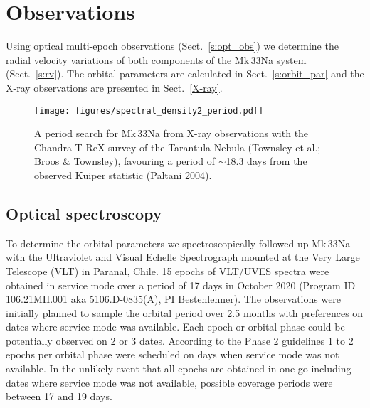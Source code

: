 \documentclass[fleqn,usenatbib]{mnras}
\begin{document}

\section{Observations}\label{UVES}
Using optical multi-epoch observations (Sect.~\ref{s:opt_obs}) we determine the radial velocity variations of both components of the Mk\,33Na system (Sect.~\ref{s:rv}). The orbital parameters are calculated in Sect.~\ref{s:orbit_par} and the X-ray observations are presented in Sect.~\ref{X-ray}.

\begin{figure}
	\texttt{[image: figures/spectral\_density2\_period.pdf]}
    \caption{A period search for Mk\,33Na from  X-ray observations with the Chandra T-ReX survey of the Tarantula Nebula (Townsley et al.; Broos \& Townsley), favouring a period of $\sim$18.3 days from the observed Kuiper statistic (Paltani 2004).}
    \label{f:spec_dens_period}
\end{figure}



\subsection{Optical spectroscopy\label{s:opt_obs}}

To determine the orbital parameters we spectroscopically followed up Mk\,33Na \citep[RA\,05:38:44.34, DEC\,-69:05:54.6, J2015.5, GaiaDR2][]{gaia2018} with the Ultraviolet and Visual Echelle Spectrograph \citep[UVES,][]{dekker2000} mounted at the Very Large Telescope (VLT) in Paranal, Chile. 15 epochs of VLT/UVES spectra were obtained in service mode over a period of 17 days in October 2020 (Program ID 106.21MH.001 aka 5106.D-0835(A), PI Bestenlehner). The observations were initially planned to sample the orbital period over 2.5 months with preferences on dates where service mode was available. Each epoch or orbital phase could be potentially observed on 2 or 3 dates. According to the Phase 2 guidelines 1 to 2 epochs per orbital phase were scheduled on days when service mode was not available. In the unlikely event that all epochs are obtained in one go including dates where service mode was not available, possible coverage periods were between 17 and 19 days.
\end{document}
